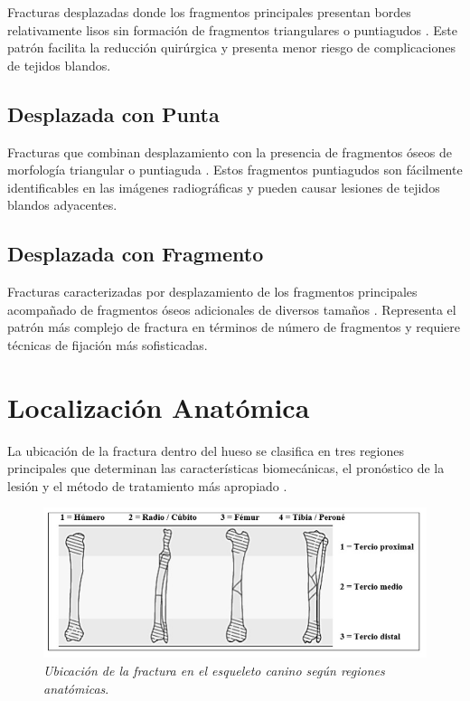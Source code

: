 {Fracturas desplazadas donde los fragmentos principales presentan bordes relativamente lisos sin formación de fragmentos triangulares o puntiagudos \cite{johnson2018fundamentals}. Este patrón facilita la reducción quirúrgica y presenta menor riesgo de complicaciones de tejidos blandos.

\subsection{Desplazada con Punta}

Fracturas que combinan desplazamiento con la presencia de fragmentos óseos de morfología triangular o puntiaguda \cite{tobias2017veterinary}. Estos fragmentos puntiagudos son fácilmente identificables en las imágenes radiográficas y pueden causar lesiones de tejidos blandos adyacentes.

\subsection{Desplazada con Fragmento}

Fracturas caracterizadas por desplazamiento de los fragmentos principales acompañado de fragmentos óseos adicionales de diversos tamaños \cite{piermattei2016handbook}. Representa el patrón más complejo de fractura en términos de número de fragmentos y requiere técnicas de fijación más sofisticadas.

\section{Localización Anatómica}

La ubicación de la fractura dentro del hueso se clasifica en tres regiones principales que determinan las características biomecánicas, el pronóstico de la lesión y el método de tratamiento más apropiado \cite{markel2019biomechanics}.

\begin{figure}[H]
\leavevmode
\begin{minipage}{\textwidth}
\begin{center}
\includegraphics[width=1\textwidth]{./capitulo_02/figures/Ubicacion_de_la_Fractura}
\caption{\textit{Ubicación de la fractura en el esqueleto canino según regiones anatómicas}. \label{fig:ubicacion_fractura}}
\end{center}
\end{minipage}
\end{figure}

}
